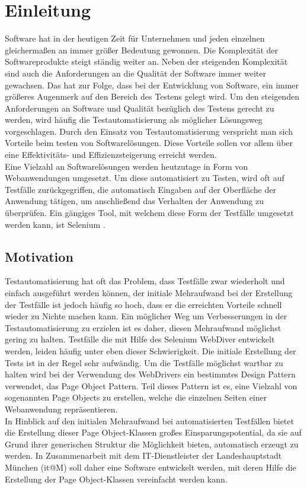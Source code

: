\chapter{Einleitung}
\label{sec:einleitung}
Software hat in der heutigen Zeit für Unternehmen und jeden einzelnen gleichermaßen an immer größer Bedeutung gewonnen.
Die Komplexität der Softwareprodukte steigt ständig weiter an. Neben der steigenden Komplexität sind auch die Anforderungen an die Qualität der Software immer weiter gewachsen.
Das hat zur Folge, dass bei der Entwicklung von Software, ein immer größeres Augenmerk auf den Bereich des Testens gelegt wird.
Um den steigenden Anforderungen an Software und Qualität bezüglich des Testens gerecht zu werden, wird häufig die Testautomatisierung als möglicher Lösungsweg vorgeschlagen.
Durch den Einsatz von Testautomatisierung verspricht man sich Vorteile beim testen von Softwarelösungen. Diese Vorteile sollen vor allem über eine Effektivitäts- und Effizienzsteigerung erreicht werden.\\
Eine Vielzahl an Softwarelösungen werden heutzutage in Form von Webanwendungen umgesetzt.
Um diese automatisiert zu Testen, wird oft auf Testfälle zurückgegriffen, die automatisch Eingaben auf der Oberfläche der Anwendung tätigen, um anschließend das Verhalten der Anwendung zu überprüfen.
Ein gängiges Tool, mit welchem diese Form der Testfälle umgesetzt werden kann, ist Selenium \cite{selenium_selenium_2015}.
\\

\section{Motivation}
\label{sec:motivation}
Testautomatisierung hat oft das Problem, dass Testfälle zwar wiederholt und einfach ausgeführt werden können, der initiale Mehraufwand bei der Erstellung der Testfälle ist jedoch häufig so hoch, dass er die erreichten Vorteile schnell wieder zu Nichte machen kann. Ein möglicher Weg um Verbesserungen in der Testautomatisierung zu erzielen ist es daher, diesen Mehraufwand möglichst gering zu halten.
Testfälle die mit Hilfe des Selenium WebDiver entwickelt werden, leiden häufig unter eben dieser Schwierigkeit. Die initiale Erstellung der Tests ist in der Regel sehr aufwändig.
Um die Testfälle möglichst wartbar zu halten wird bei der Verwendung des WebDrivers ein bestimmtes Design Pattern verwendet, das Page Object Pattern.
Teil dieses Pattern ist es, eine Vielzahl von sogenannten Page Objects zu erstellen, welche die einzelnen Seiten einer Webanwendung repräsentieren.\\
In Hinblick auf den initialen Mehraufwand bei automatisierten Testfällen bietet die Erstellung dieser Page Object-Klassen großes Einsparungspotential, da sie auf Grund ihrer generischen Struktur die Möglichkeit bieten, automatisch erzeugt zu werden.
In Zusammenarbeit mit dem IT-Dienstleister der Landeshauptstadt München (it@M) soll daher eine Software entwickelt werden, mit deren Hilfe die Erstellung der Page Object-Klassen vereinfacht werden kann.

